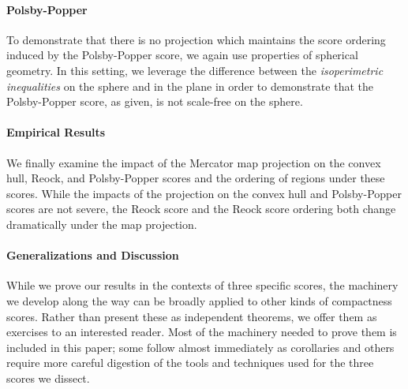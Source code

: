 \paragraph{Polsby-Popper}
To demonstrate that there is no projection which maintains the score ordering induced by the Polsby-Popper score, we again use properties of spherical geometry.  In this setting, we leverage the 
difference between the \textit{isoperimetric inequalities} on the sphere and in the plane in order to 
demonstrate that the Polsby-Popper score, as given, is not scale-free on the sphere.  

\paragraph{Empirical Results}
We finally examine the impact of the Mercator map projection on the convex hull, Reock, and Polsby-Popper 
scores and the ordering of regions under these scores.  While the impacts of the projection on the convex hull and 
 Polsby-Popper scores are not severe, the Reock score and the Reock score ordering both change dramatically 
 under the map projection.


\paragraph{Generalizations and Discussion}
While we prove our results in the contexts of three specific scores, the machinery we develop along the way can be broadly applied to other kinds of compactness scores.  Rather than present these as independent theorems, we offer them as exercises to an interested reader.  Most of the machinery needed to prove them is included in this paper; some follow almost immediately as corollaries and others require more careful digestion of the tools and techniques used for the three scores we dissect.



